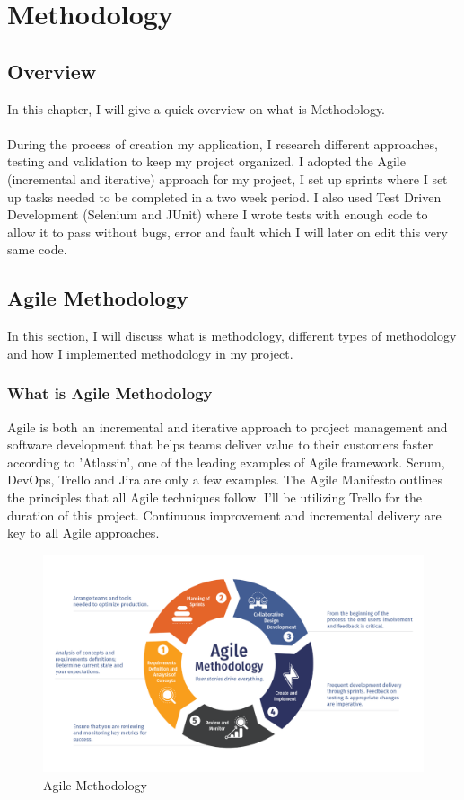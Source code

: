 \chapter{Methodology}

\section{Overview}

In this chapter, I will give a quick overview on what is Methodology.\\ \\
During the process of creation my application, I research different approaches, testing and validation to keep my project organized. I adopted the Agile (incremental and iterative) approach for my project, I set up sprints where I set up tasks needed to be completed in a two week period. I also used Test Driven Development (Selenium and JUnit) where I wrote tests with enough code to allow it to pass without bugs, error and fault which I will later on edit this very same code.

\section{Agile Methodology}

In this section, I will discuss what is methodology, different types of methodology and how I implemented methodology in my project.

\subsection{What is Agile Methodology}

Agile is both an incremental and iterative approach to project management and software development that helps teams deliver value to their customers faster according to 'Atlassin', one of the leading examples of Agile framework. Scrum, DevOps, Trello and Jira are only a few examples. The Agile Manifesto outlines the principles that all Agile techniques follow. I'll be utilizing Trello for the duration of this project. Continuous improvement and incremental delivery are key to all Agile approaches.

\begin{figure}[H]
  \includegraphics[width=\textwidth]{img/agilemeth.png}
  \caption{Agile Methodology}
  \label{fig: Agile Lifecycle}
\end{figure}

